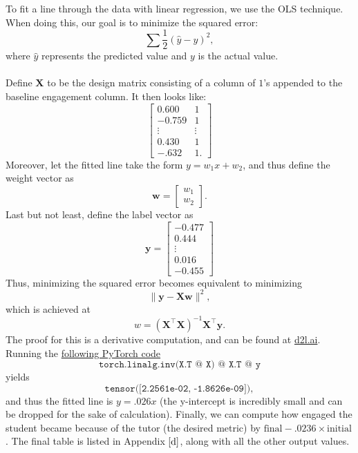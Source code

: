 \documentclass[12pt]{article}
\begin{document}
To fit a line through the data with linear regression, we use the OLS technique. When doing this, our goal is to minimize the squared error:
\[\sum \frac 12 (\hat{y} - y)^2,\] where $\hat y$ represents the predicted value and $y$ is the actual value.
\\\\
Define $\mathbf X$ to be the design matrix consisting of a column of $1$'s appended to the baseline engagement column. It then looks like:
\[
\begin{bmatrix}
    0.600 & 1 \\
    -0.759 & 1 \\
    \vdots & \vdots  \\
    0.430 & 1 \\
    -.632 & 1.
\end{bmatrix}
\]
Moreover, let the fitted line take the form $y=w_1x + w_2$, and thus define the weight vector as
\[\mathbf w = \begin{bmatrix}
    w_1 \\
    w_2
\end{bmatrix}.\]
Last but not least, define the label vector as
\[\mathbf y = 
\begin{bmatrix}
    -0.477 \\
    0.444 \\
    \vdots \\
    0.016 \\
    -0.455
\end{bmatrix}\]
Thus, minimizing the squared error becomes equivalent to minimizing
\[\|\mathbf y - \mathbf X \mathbf w \|^2, \] which is achieved at
\[w = (\mathbf X^\top \mathbf X)^{-1}  \mathbf X^{\top} \mathbf y.\] The proof for this is a derivative computation, and can be found at \href{https://d2l.ai/chapter_linear-regression/linear-regression.html}{d2l.ai}. Running the \href{https://colab.research.google.com/drive/1dz1KTdW83w6i_jnsk0L2mwTmZKUxytPn#scrollTo=1IRfv-kpzz3Z}{following PyTorch code}
\[\texttt{torch.linalg.inv(X.T @ X) @ X.T @ y}\] yields
\[\texttt{tensor([2.2561e-02, -1.8626e-09])}, \] and thus the fitted line is $y=.026x$ (the y-intercept is incredibly small and can be dropped for the sake of calculation). Finally, we can compute how engaged the student became because of the tutor (the desired metric) by $\text{final} - .0236\times \text{initial}$. The final table is listed in Appendix $\ref{d}$, along with all the other output values.


\newpage
\end{document}
